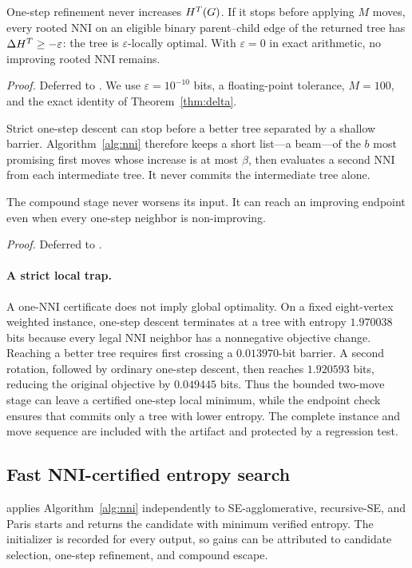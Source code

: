 \begin{proposition}\label{prop:local}
One-step refinement never increases $H^{T}(G)$. If it stops before applying $M$
moves, every rooted NNI on an eligible binary parent--child edge of the
returned tree has $\Delta H^{T}\ge-\varepsilon$: the tree is
$\varepsilon$-locally optimal. With $\varepsilon=0$ in exact arithmetic, no
improving rooted NNI remains.
\end{proposition}
\emph{Proof.} Deferred to \proofdetails.
We use $\varepsilon=10^{-10}$ bits, a floating-point tolerance, $M=100$, and
the exact identity of Theorem~\ref{thm:delta}.

Strict one-step descent can stop before a better tree separated by a shallow
barrier. Algorithm~\ref{alg:nni} therefore keeps a short list---a beam---of the
$b$ most promising first moves whose increase is at most $\beta$, then evaluates
a second NNI from each intermediate tree. It never commits the intermediate
tree alone.

\begin{proposition}\label{prop:compound}
The compound stage never worsens its input. It can reach an improving endpoint
even when every one-step neighbor is non-improving.
\end{proposition}
\emph{Proof.} Deferred to \proofdetails.

\paragraph{A strict local trap.}
A one-NNI certificate does not imply global optimality. On a fixed
eight-vertex weighted instance, one-step descent terminates at a tree with
entropy $1.970038$ bits because every legal NNI neighbor has a nonnegative
objective change. Reaching a better tree requires first crossing a
$0.013970$-bit barrier. A second rotation, followed by ordinary one-step
descent, then reaches $1.920593$ bits, reducing the original objective by
$0.049445$ bits. Thus the bounded two-move stage can leave a certified
one-step local minimum, while the endpoint check ensures that \NEST commits
only a tree with lower entropy. The complete instance and move sequence are
included with the artifact and protected by a regression test.

\subsection{Fast NNI-certified entropy search}
\NEST applies Algorithm~\ref{alg:nni} independently to SE-agglomerative,
recursive-SE, and Paris starts and returns the candidate with minimum verified
entropy. The initializer is recorded for every output,
so gains can be attributed to candidate selection, one-step refinement, and
compound escape.

